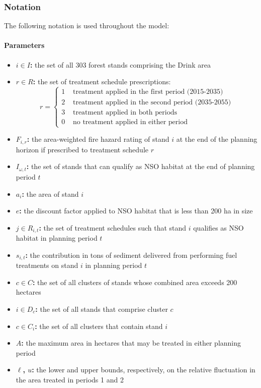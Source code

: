 \subsubsection{Notation}
The following notation is used throughout the model:
\paragraph{Parameters}
\begin{itemize}
\item \textbf{$i \in I$:} the set of all 303 forest stands comprising the Drink area
\item \textbf{$r \in R$:} the set of treatment schedule prescriptions:
	$$
	r =
	\begin{cases}
	1 &\text{ treatment applied in the first period (2015-2035)}\\
	2 &\text{ treatment applied in the second period (2035-2055)}\\
	3 &\text{ treatment applied in both periods}\\
	0 &\text{ no treatment applied in either period}
	\end{cases}
	$$
\item \textbf{$F_{i,r}$:} the area-weighted fire hazard rating of stand $i$ at the end of the planning horizon if prescribed to treatment schedule $r$
\item \textbf{$I_{\omega,t}$:} the set of stands that can qualify as NSO habitat at the end of planning period $t$
\item \textbf{$a_i$:} the area of stand $i$
\item \textbf{$e$:} the discount factor applied to NSO habitat that is less than 200 ha in size
\item \textbf{$j \in R_{i,t}$:} the set of treatment schedules such that stand $i$ qualifies as NSO habitat in planning period $t$
\item \textbf{$s_{i,t}$:} the contribution in tons of sediment delivered from performing fuel treatments on stand $i$ in planning period $t$
\item \textbf{$c \in C$:} the set of all clusters of stands whose combined area exceeds 200 hectares
\item \textbf{$i \in D_c$:} the set of all stands that comprise cluster $c$
\item \textbf{$c \in C_i$:} the set of all clusters that contain stand $i$
\item \textbf{$A$:} the maximum area in hectares that may be treated in either planning period
\item \textbf{$\ell$, $u$:} the lower and upper bounds, respectively, on the relative fluctuation in the area treated in periods 1 and 2
\end{itemize}

